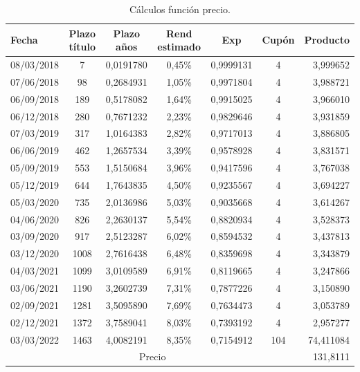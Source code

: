 \renewcommand{\tablename}{Tabla}
\begin{table}[H]
\centering
{\begin{tabular}[t]{|l |c |c |c |c |c |r|}
\hline
Fecha & Plazo t\'itulo & Plazo a\~nos & Rend estimado & Exp & Cup\'on & Producto \\
\hline
08/03/2018 & 7  & 0,0191780 & 0,45\% & 0,9999131 & 4& 3,999652\\
\hline
07/06/2018 & 98 & 0,2684931 & 1,05\% & 0,9971804 & 4& 3,988721\\
\hline
06/09/2018 & 189 & 0,5178082 & 1,64\% & 0,9915025 & 4& 3,966010\\
\hline
06/12/2018 & 280 & 0,7671232 & 2,23\% & 0,9829646 & 4& 3,931859\\
\hline
07/03/2019 & 317 & 1,0164383 & 2,82\% & 0,9717013 & 4& 3,886805\\
\hline
06/06/2019 & 462 & 1,2657534 & 3,39\% & 0,9578928 & 4& 3,831571\\
\hline
05/09/2019 & 553 & 1,5150684 & 3,96\% & 0,9417596 & 4& 3,767038\\
\hline
05/12/2019 & 644 & 1,7643835 & 4,50\% & 0,9235567 & 4& 3,694227\\
\hline
05/03/2020 & 735 & 2,0136986 & 5,03\% & 0,9035668 & 4& 3,614267\\
\hline
04/06/2020 & 826 & 2,2630137 & 5,54\% & 0,8820934 & 4& 3,528373\\
\hline
03/09/2020 & 917 & 2,5123287 & 6,02\% & 0,8594532 & 4& 3,437813\\
\hline
03/12/2020 & 1008 & 2,7616438 & 6,48\% & 0,8359698 & 4& 3,343879\\
\hline
04/03/2021 & 1099 & 3,0109589 & 6,91\% & 0,8119665 & 4& 3,247866\\
\hline
03/06/2021 & 1190 & 3,2602739 & 7,31\% & 0,7877226 & 4& 3,150890\\
\hline
02/09/2021 & 1281 & 3,5095890 & 7,69\% & 0,7634473 & 4& 3,053789\\
\hline
02/12/2021 & 1372 & 3,7589041 & 8,03\% & 0,7393192 & 4& 2,957277\\
\hline
03/03/2022 & 1463 & 4,0082191 & 8,35\% & 0,7154912 & 104 & 74,411084\\
\hline
\multicolumn{6}{|c|}{Precio} & 131,8111 \\
\hline
\end{tabular}
}
\caption{C\'alculos funci\'on precio.}
\label{tabla1}
\end{table}

